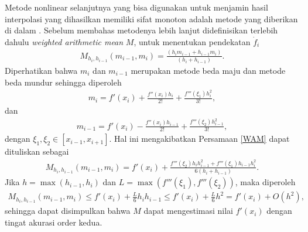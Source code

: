 Metode nonlinear selanjutnya yang bisa digunakan untuk menjamin hasil interpolasi yang dihasilkan memiliki sifat monoton adalah metode yang diberikan di dalam \cite{arandigaMN}. Sebelum membahas metodenya lebih lanjut didefinisikan terlebih dahulu \textit{weighted arithmetic mean} $M$, untuk menentukan pendekatan $\dot{f}_i$
\begin{gather}\label{WAM}
     M_{h_i,h_{i-1}}(m_{i-1},m_{i}) = \frac{(h_im_{i-1} + h_{i-1}m_i)}{(h_i + h_{i-1})}.
\end{gather}
Diperhatikan bahwa $m_i$ dan $m_{i-1}$ merupakan metode beda maju dan metode beda mundur sehingga diperoleh
\begin{align*}
    m_i = f'(x_i) + \frac{f''(x_i)h_i}{2!} + \frac{f'''(\xi_1)h_i^2}{3!},
\end{align*}
dan
\begin{align*}
    m_{i-1} = f'(x_i) - \frac{f''(x_i)h_{i-1}}{2!} + \frac{f'''(\xi_2)h_{i-1}^2}{3!},
\end{align*}
dengan $\xi_1, \xi_2 \in [x_{i-1},x_{i+1}]$.
Hal ini mengakibatkan Persamaan \eqref{WAM} dapat dituliskan sebagai
\begin{align*}
    M_{h_i,h_{i-1}}(m_{i-1},m_{i}) = f'(x_i) + \frac{ f'''(\xi_2)h_ih_{i-1}^2 + f'''(\xi_1)h_{i-1}h_i^2}{6(h_i + h_{i-1})}.
\end{align*}
Jika $h = \max(h_{i-1},h_i)$ dan $L = \max(f'''(\xi_1),f'''(\xi_2))$, maka diperoleh
\begin{align*}
    M_{h_i,h_{i-1}}(m_{i-1},m_{i}) \leq f'(x_i) + \frac{L}{6}h_ih_{i-1} \leq f'(x_i) + \frac{L}{6}h^2 = f'(x_i) + O(h^2),
\end{align*}
sehingga dapat disimpulkan bahwa $M$ dapat mengestimasi nilai $f'(x_i)$ dengan tingat akurasi order kedua.


